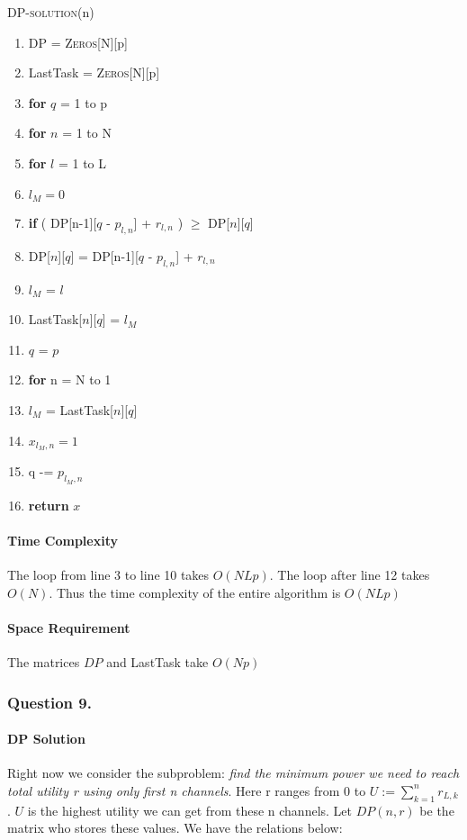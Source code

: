 \documentclass[11pt, oneside]{report}
\begin{document}
\noindent\textsc{DP-solution}(n)
\begin{enumerate}[1\ ]
\setlength{\topsep}{0.05ex}
\setlength{\itemsep}{0.05ex}
\item DP = \textsc{Zeros}[N][p]
\item LastTask = \textsc{Zeros}[N][p]
\item \textbf{for} $q$ = 1 to p
\item \qquad \textbf{for} $n$ = 1 to N
\item \qquad \qquad \textbf{for} $l$ = 1 to L
\item \qquad \qquad \qquad $l_M = 0$
\item \qquad \qquad \qquad \textbf{if} ( DP[n-1][$q$ - $p_{l,n}$] + $r_{l,n}$ ) $\geq$ DP[$n$][$q$]
\item \qquad \qquad \qquad \qquad DP[$n$][$q$] = DP[n-1][$q$ - $p_{l,n}$] + $r_{l,n}$
\item \qquad \qquad \qquad \qquad $l_M$ = $l$
\item \qquad \qquad LastTask[$n$][$q$] = $l_M$
\item $q$ = $p$
\item \textbf{for} n = N to 1
\item \qquad $l_M$ = LastTask[$n$][$q$]
\item \qquad $x_{l_M, n} = 1$
\item \qquad q -= $p_{l_M, n}$
\item \textbf{return} $x$
\end{enumerate}

\paragraph{Time Complexity} The loop from line 3 to line 10 takes $O(NLp)$. The loop after line 12 takes $O(N)$. Thus the time complexity of the entire algorithm is $O(NLp)$
\paragraph{Space Requirement} The matrices $DP$ and LastTask take $O(Np)$

\subsubsection{Question 9. }
\paragraph{DP Solution} Right now we consider the subproblem: \textit{find the minimum power we need to reach total utility r using only first n channels}. Here r ranges from $0$ to $U := \sum_{k = 1}^{n} r_{L,k}$. $U$ is the highest utility we can get from these n channels. Let $DP(n,r)$ be the matrix who stores these values. We have the relations below:
\end{document}
